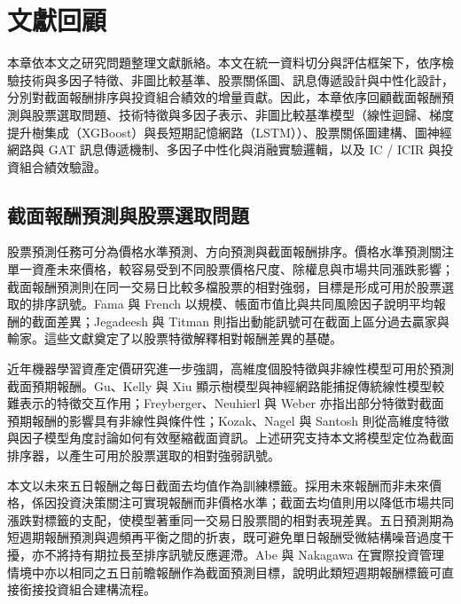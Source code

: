 \chapter{文獻回顧}
\label{ch:relatedwork}

本章依本文之研究問題整理文獻脈絡。本文在統一資料切分與評估框架下，依序檢驗技術與多因子特徵、非圖比較基準、股票關係圖、訊息傳遞設計與中性化設計，分別對截面報酬排序與投資組合績效的增量貢獻。因此，本章依序回顧截面報酬預測與股票選取問題、技術特徵與多因子表示、非圖比較基準模型（線性迴歸、梯度提升樹集成（XGBoost）與長短期記憶網路（LSTM））、股票關係圖建構、圖神經網路與 GAT 訊息傳遞機制、多因子中性化與消融實驗邏輯，以及 IC / ICIR 與投資組合績效驗證。

\section{截面報酬預測與股票選取問題}
\label{sec:cross_sectional_return_stock_selection}

股票預測任務可分為價格水準預測、方向預測與截面報酬排序。價格水準預測關注單一資產未來價格，較容易受到不同股票價格尺度、除權息與市場共同漲跌影響；截面報酬預測則在同一交易日比較多檔股票的相對強弱，目標是形成可用於股票選取的排序訊號。Fama 與 French \cite{fama1992cross_section,FAMA19933} 以規模、帳面市值比與共同風險因子說明平均報酬的截面差異；Jegadeesh 與 Titman \cite{jegadeesh1993returns} 則指出動能訊號可在截面上區分過去贏家與輸家。這些文獻奠定了以股票特徵解釋相對報酬差異的基礎。

近年機器學習資產定價研究進一步強調，高維度個股特徵與非線性模型可用於預測截面預期報酬。Gu、Kelly 與 Xiu \cite{gu2020empirical} 顯示樹模型與神經網路能捕捉傳統線性模型較難表示的特徵交互作用；Freyberger、Neuhierl 與 Weber \cite{freyberger2020dissecting} 亦指出部分特徵對截面預期報酬的影響具有非線性與條件性；Kozak、Nagel 與 Santosh \cite{kozak2020shrinking} 則從高維度特徵與因子模型角度討論如何有效壓縮截面資訊。上述研究支持本文將模型定位為截面排序器，以產生可用於股票選取的相對強弱訊號。

本文以未來五日報酬之每日截面去均值作為訓練標籤。採用未來報酬而非未來價格，係因投資決策關注可實現報酬而非價格水準；截面去均值則用以降低市場共同漲跌對標籤的支配，使模型著重同一交易日股票間的相對表現差異。五日預測期為短週期報酬預測與週頻再平衡之間的折衷，既可避免單日報酬受微結構噪音過度干擾，亦不將持有期拉長至排序訊號反應遲滯。Abe 與 Nakagawa \cite{abe2020cross_sectional_daily} 在實際投資管理情境中亦以相同之五日前瞻報酬作為截面預測目標，說明此類短週期報酬標籤可直接銜接投資組合建構流程。

